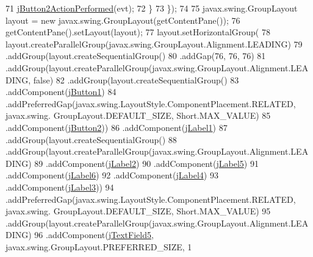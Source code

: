 \begin{DoxyCode}
71                 \mbox{\hyperlink{class_interfaz_package_1_1_alta_lectores_a15e953f7a9cd8a7448fdac22f39f55aa}{jButton2ActionPerformed}}(evt);
72             \}
73         \});
74 
75         javax.swing.GroupLayout layout = \textcolor{keyword}{new} javax.swing.GroupLayout(getContentPane());
76         getContentPane().setLayout(layout);
77         layout.setHorizontalGroup(
78             layout.createParallelGroup(javax.swing.GroupLayout.Alignment.LEADING)
79             .addGroup(layout.createSequentialGroup()
80                 .addGap(76, 76, 76)
81                 .addGroup(layout.createParallelGroup(javax.swing.GroupLayout.Alignment.LEADING, \textcolor{keyword}{false})
82                     .addGroup(layout.createSequentialGroup()
83                         .addComponent(\mbox{\hyperlink{class_interfaz_package_1_1_alta_lectores_a022b628c2a9a98d3d2e05f2776bad642}{jButton1}})
84                         .addPreferredGap(javax.swing.LayoutStyle.ComponentPlacement.RELATED, javax.swing.
      GroupLayout.DEFAULT\_SIZE, Short.MAX\_VALUE)
85                         .addComponent(\mbox{\hyperlink{class_interfaz_package_1_1_alta_lectores_a8e96fe07c387d4a3215d30dc25442f6a}{jButton2}}))
86                     .addComponent(\mbox{\hyperlink{class_interfaz_package_1_1_alta_lectores_a3c66bd5bf27274226564fa37c644c9e7}{jLabel1}})
87                     .addGroup(layout.createSequentialGroup()
88                         .addGroup(layout.createParallelGroup(javax.swing.GroupLayout.Alignment.LEADING)
89                             .addComponent(\mbox{\hyperlink{class_interfaz_package_1_1_alta_lectores_adfb75b51296b24b4165ef9d2ffe4e9fd}{jLabel2}})
90                             .addComponent(\mbox{\hyperlink{class_interfaz_package_1_1_alta_lectores_a59070bf77faf3741fbd2648451cd3075}{jLabel5}})
91                             .addComponent(\mbox{\hyperlink{class_interfaz_package_1_1_alta_lectores_a8af45e7375fe9c6f739b4d5bc09bb983}{jLabel6}})
92                             .addComponent(\mbox{\hyperlink{class_interfaz_package_1_1_alta_lectores_a39c95238a43795188e9eeeafa177e0c8}{jLabel4}})
93                             .addComponent(\mbox{\hyperlink{class_interfaz_package_1_1_alta_lectores_a8540271f20afc2b5d9e7b8ece4ec5e93}{jLabel3}}))
94                         .addPreferredGap(javax.swing.LayoutStyle.ComponentPlacement.RELATED, javax.swing.
      GroupLayout.DEFAULT\_SIZE, Short.MAX\_VALUE)
95                         .addGroup(layout.createParallelGroup(javax.swing.GroupLayout.Alignment.LEADING)
96                             .addComponent(\mbox{\hyperlink{class_interfaz_package_1_1_alta_lectores_a8486f57ea492fe17d177c837d057d73e}{jTextField5}}, javax.swing.GroupLayout.PREFERRED\_SIZE, 1

\end{DoxyCode}
